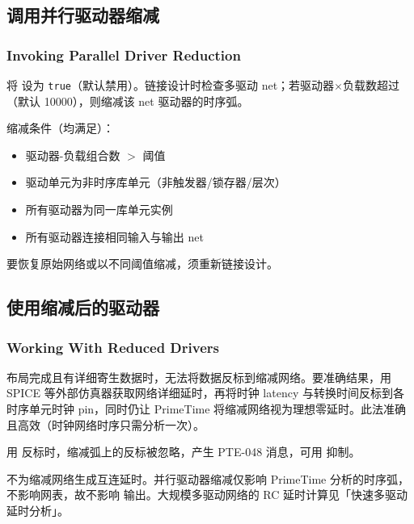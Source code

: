 
\subsection{调用并行驱动器缩减}
\subsubsection*{Invoking Parallel Driver Reduction}

将  设为 \texttt{true}（默认禁用）。链接设计时检查多驱动 net；若驱动器$\times$负载数超过 （默认 10000），则缩减该 net 驱动器的时序弧。

缩减条件（均满足）：
\begin{itemize}
  \item 驱动器-负载组合数 $>$ 阈值
  \item 驱动单元为非时序库单元（非触发器/锁存器/层次）
  \item 所有驱动器为同一库单元实例
  \item 所有驱动器连接相同输入与输出 net
\end{itemize}

要恢复原始网络或以不同阈值缩减，须重新链接设计。

\subsection{使用缩减后的驱动器}
\subsubsection*{Working With Reduced Drivers}

布局完成且有详细寄生数据时，无法将数据反标到缩减网络。要准确结果，用 SPICE 等外部仿真器获取网络详细延时，再将时钟 latency 与转换时间反标到各时序单元时钟 pin，同时仍让 PrimeTime 将缩减网络视为理想零延时。此法准确且高效（时钟网络时序只需分析一次）。

用  反标时，缩减弧上的反标被忽略，产生 PTE-048 消息，可用  抑制。

 不为缩减网络生成互连延时。并行驱动器缩减仅影响 PrimeTime 分析的时序弧，不影响网表，故不影响  输出。大规模多驱动网络的 RC 延时计算见「快速多驱动延时分析」。

